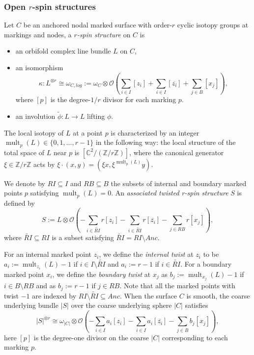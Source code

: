 \documentclass[11pt]{amsart}
\theoremstyle{definition}
\theoremstyle{remark}
\newcommand{\<}{\left<}
\renewcommand{\>}{\right>}
\numberwithin{equation}{section}
\begin{document}
\subsubsection{Open $r$-spin structures}
Let $C$ be an anchored nodal marked surface with
order-$r$ cyclic isotopy groups at markings and nodes, a \textit{$r$-spin structure} on $C$ is 
\begin{itemize}
    \item 
 an orbifold complex line bundle $L$ on $C$,

\item an isomorphism 
$$\kappa:L^{\otimes r} \cong \omega_{C,log}:=\omega_{C} \otimes {\mathcal{O}}\left(\sum_{i \in I}  [z_i] + \sum_{i \in I}  [\overline{z_i}] + \sum_{j \in B} [x_j]\right),$$
where $[p]$ is the degree-$1/r$ divisor for each marking $p$. 

\item an involution $\widetilde{\phi}: L \to L$ lifting $\phi$.
\end{itemize}
The local isotopy of $L$ at a point $p$ is characterized by an integer $\operatorname{mult}_p(L)\in \{0,1,\dots,r-1\}$ in the following way: the local structure of the total space of $L$ near $p$ is $[\mathbb C^2/(\mathbb Z/r\mathbb Z)]$, where the canonical generator $\xi \in \mathbb Z/r\mathbb Z$ acts by $\xi\cdot (x,y)=(\xi x, \xi^{\operatorname{mult}_p(L)}y)$.

We denote by $RI\subseteq I$ and $RB\subseteq B$ the subsets of internal and boundary marked points $p$ satisfying $\operatorname{mult}_p(L)=0$. An \textit{associated twisted r-spin structure} $S$ is defined by
$$
S:=L\otimes \mathcal O\left( -\sum_{i \in \widetilde{RI}} r [z_i] - \sum_{i \in \widetilde{RI}} r [\overline{z_i}] - \sum_{j \in RB} r [x_j]\right),
$$
where $\widetilde{RI}\subseteq RI$ is a subset satisfying $\widetilde{RI}=RI \setminus Anc   $.



For an internal marked point $z_i$, we define the  \textit{internal twist} at $z_i$ to be $a_i:=\operatorname{mult}_{z_i}(L)-1$ if $i\in I\setminus \widetilde{RI}$
and $a_i:=r-1$ if $i\in \widetilde{RI}$. For a boundary marked point $x_i$, we define the  \textit{boundary twist} at $x_j$ as $b_j:=\operatorname{mult}_{x_j}(L)-1$ if $i\in B\setminus {RB}$ and as $b_j:=r-1$ if $j\in {RB}$. Note that all the marked points with twist $-1$ are indexed by $RI\setminus \widetilde{RI}\subseteq Anc$. When the surface $C$ is smooth, the coarse underlying bundle $|S|$ over the coarse underlying sphere $|C|$ satisfies
$$|S|^{\otimes r} \cong \omega_{|C|} \otimes {\mathcal{O}}\left(-\sum_{i \in I} a_i [z_i] - \sum_{i \in I} a_i [\overline{z_i}] - \sum_{j \in B} b_j[x_j]\right),$$
here $[p]$ is the degree-one divisor on the coarse $|C|$ corresponding to each marking $p$.
\end{document}
